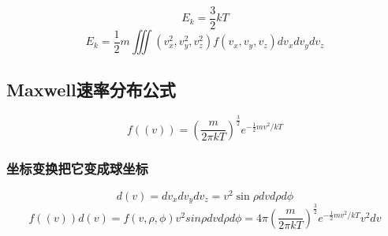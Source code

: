 \documentclass[11pt]{article}
\begin{document}
\[E_k=\frac{3}{2}kT\]
\[
E_k=\frac{1}{2} m \iiint
 (v_x^2 ,v_y^2 ,v_z^2)f(v_x ,v_y ,v_z)dv_x dv_y dv_z
\]
\subsection{Maxwell速率分布公式}
\label{sec:org8f41aff}
\[
f((v))=(\frac{m}{2\pi kT})^{\frac{3}{2}} e^{-\frac{1}{2}mv^2/kT}
\]
\subsubsection{坐标变换把它变成球坐标}
\label{sec:org3c71a00}
\[
d(v)=dv_x dv_y dv_z =v^2 \sin\rho dv d\rho d\phi
\]
\[
f((v))d(v)=f(v,\rho ,\phi )v^2 sin\rho dv d\rho d\phi =4\pi (\frac{m}{2\pi kT})^{\frac{3}{2}} e^{-\frac{1}{2}mv^2 /kT}v^2dv
\]
\end{document}
